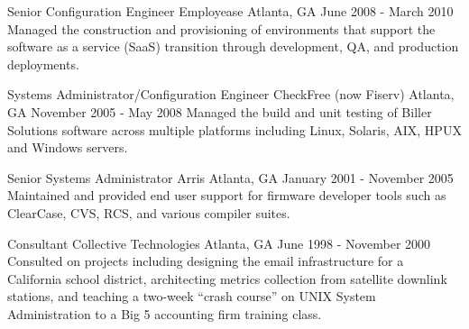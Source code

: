 \begin{cventries}
  \cventry
    {Senior Configuration Engineer} %
    {Employease} %
    {Atlanta, GA} %
    {June 2008 - March 2010} %
    {Managed the construction and provisioning of environments that support the software as a service (SaaS) transition through development, QA, and production deployments.}

  \cventry
    {Systems Administrator/Configuration Engineer} %
    {CheckFree (now Fiserv)} %
    {Atlanta, GA} %
    {November 2005 - May 2008} %
    {Managed the build and unit testing of Biller Solutions software across multiple platforms including Linux, Solaris, AIX, HPUX and Windows servers.}

  \cventry
    {Senior Systems Administrator} %
    {Arris} %
    {Atlanta, GA} %
    {January 2001 - November 2005} %
    {Maintained and provided end user support for firmware developer tools such as ClearCase, CVS, RCS, and various compiler suites.}

  \cventry
    {Consultant} %
    {Collective Technologies} %
    {Atlanta, GA} %
    {June 1998 - November 2000} %
    {Consulted on projects including designing the email infrastructure for a California school district, architecting metrics collection from satellite downlink stations, and teaching a two-week “crash course” on UNIX System Administration to a Big 5 accounting firm training class.}

\end{cventries}
